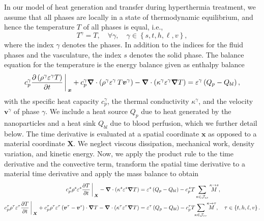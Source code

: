 \documentclass[Times1COL,AMA]{WileyNJDv5} %
\newcommand{\vct}[1]{\boldsymbol{#1}}
\begin{document}
In our model of heat generation and transfer during hyperthermia treatment, we assume that all phases are locally in a state of thermodynamic equilibrium, and hence the temperature $T$ of all phases is equal, i.e.,
\begin{equation}
    T^\gamma = T,
    \quad \forall \gamma,
    \quad
    \gamma \in \left\{ s, t, h, \ell, v \right\},
\end{equation}
where the index $\gamma$ denotes the phases.
In addition to the indices for the fluid phases and the vasculature, the index $s$ denotes the solid phase.
The balance equation for the temperature is the energy balance given as enthalpy balance \cite{Pesavento2016}
\begin{equation}
    c_{p}^{\gamma}\frac{\partial \left( \rho^\gamma \varepsilon^\gamma T \right)}{\partial t}
    \bigg\arrowvert_{\vct{x}}
    +
    c_{p}^{\gamma} \vct{\nabla} \cdot \left( \rho^\gamma \varepsilon^\gamma \, T \vct{v}^\gamma \right)
    -
    \vct{\nabla} \cdot \left( \kappa^\gamma \varepsilon^\gamma \vct{\nabla} T \right)
    =
    \varepsilon^\gamma \left(Q_p - Q_{bl}\right),
\end{equation}
with the specific heat capacity $c_{p}^{\gamma}$, the thermal conductivity $\kappa^\gamma$, and the velocity $\vct{v}^\gamma$ of phase $\gamma$.
We include a heat source $Q_p$ due to heat generated by the nanoparticles and a heat sink $Q_{bl}$ due to blood perfusion, which we further detail below.
The time derivative is evaluated at a spatial coordinate $\vct{x}$ as opposed to a material coordinate $\vct{X}$.
We neglect viscous dissipation, mechanical work, density variation, and kinetic energy.
Now, we apply the product rule to the time derivative and the convective term, transform the spatial time derivative to a material time derivative and apply the mass balance to obtain
\begin{subequations}
    \label{Eq:HeatEquationTransformed}
    \begin{align}
        c_{p}^{\,s} \rho^s \varepsilon^s \frac{\partial T}{\partial t}
        \bigg\arrowvert_{\vct{X}}
        -
        \vct{\nabla} \cdot \left(\kappa^s \varepsilon^s \vct\nabla T \right)
         & =
        \varepsilon^s \left(Q_p - Q_{bl}\right)
        -
        c_{p}^{\,s} T \sum\limits_{\kappa \in \mathcal{J}_{cs}} \overset{\kappa \rightarrow s}{M},
        \\
        c_{p}^{\tau} \rho^\tau \varepsilon^\tau \frac{\partial T}{\partial t}
        \bigg\arrowvert_{\vct{X}}
        +
        c_{p}^{\tau} \rho^\tau \varepsilon^\tau \left( \vct{v}^\tau - \vct{v}^{s} \right) \cdot \vct{\nabla} T
        -
        \vct{\nabla} \cdot \left( \kappa^\tau \varepsilon^\tau \vct{\nabla} T \right)
         & =
        \varepsilon^\tau \left(Q_p - Q_{bl}\right)
        -
        c_{p}^{\tau} T \hspace{-1mm} \sum\limits_{\kappa \in \mathcal{J}_{c\tau}}\hspace{-1mm} \overset{\kappa \rightarrow \tau}{M},
        \quad
        \tau \in \left\{ t, h, \ell, v \right\}.
    \end{align}
\end{subequations}
\end{document}
